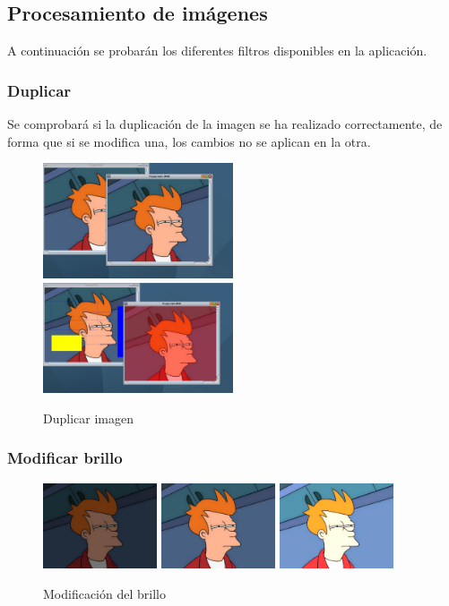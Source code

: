 \subsection{Procesamiento de imágenes}
A continuación se probarán los diferentes filtros disponibles en la aplicación.
\subsubsection{Duplicar}
Se comprobará si la duplicación de la imagen se ha realizado correctamente, de forma que si se modifica una, los cambios no se aplican en la otra.
\vskip0.3cm
\begin{figure}[H]
 \centering
  \includegraphics[width=0.5\textwidth]{imagenes/duplicar1.png}
  \includegraphics[width=0.5\textwidth]{imagenes/duplicar2.jpg}
 \caption{Duplicar imagen}
 \label{diseño}
 \end{figure}
\subsubsection{Modificar brillo}
\vskip0.3cm
\begin{figure}[H]
 \centering
  \includegraphics[width=0.3\textwidth]{imagenes/fryBrilo2.jpg}
  \includegraphics[width=0.3\textwidth]{imagenes/Fry.jpg}
  \includegraphics[width=0.3\textwidth]{imagenes/fryBrillo1.jpg}
 \caption{Modificación del brillo}
 \label{diseño}
\end{figure}
